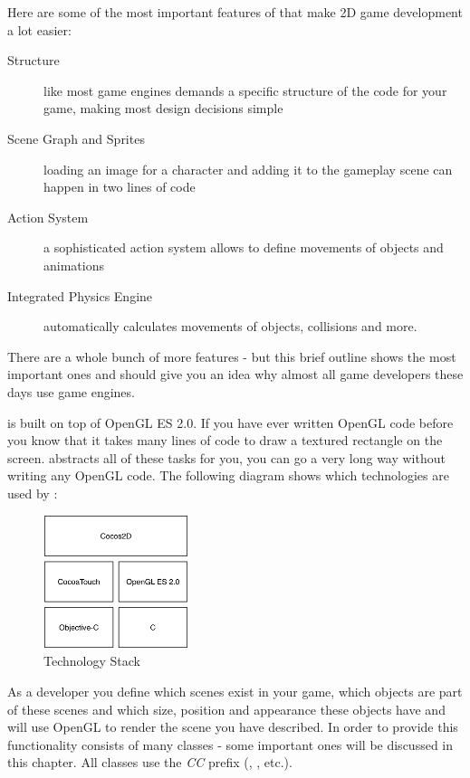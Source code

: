 Here are some of the most important features of \cocos{} that make 2D game
development a lot easier:
\begin{description}
  \item[Structure] like most game engines \cocos{} demands a specific structure
  of the code for your game, making most design decisions simple
  \item[Scene Graph and Sprites] loading an image for a character and adding it
  to the gameplay scene can happen in two lines of code
  \item[Action System] a sophisticated action system allows to define movements
  of objects and animations
  \item[Integrated Physics Engine] automatically calculates movements of
  objects, collisions and more.
\end{description}
There are a whole bunch of more features - but this brief outline shows the most
important ones and should give you an idea why almost all game developers these
days use game engines. 

\cocos{} is built on top of OpenGL ES 2.0. If you have ever written OpenGL code
before you know that it takes many lines of code to draw a textured rectangle on
the screen. \cocos{} abstracts all of these tasks for you, you can go a very
long way without writing any OpenGL code. The following diagram shows which
technologies are used by \cocos{}:

\begin{figure}[H]
		\centering
		\includegraphics[width=120pt]{images/cocos2d/TechnologyStack.png}     
		\caption{\cocos{} Technology Stack}
\end{figure}

As a \cocos{} developer you define which scenes exist in your game, which
objects are part of these scenes and which size, position and appearance these
objects have and \cocos{} will use OpenGL to render the scene you have
described. In order to provide this functionality \cocos{} consists of many
classes - some important ones will be discussed in this chapter. All \cocos{}
classes use the \textit{CC} prefix (\ccscene{}, \ccnode{}, etc.).

